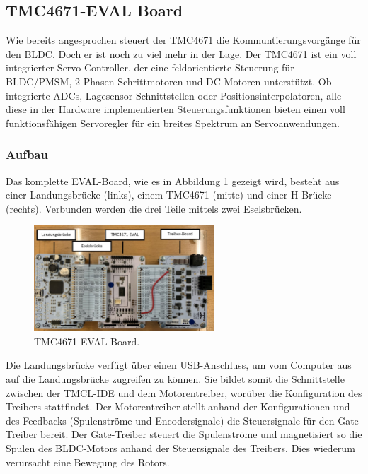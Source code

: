 \subsection{TMC4671-EVAL Board}\label{subsec:TMC4671_EVAL_Boad}

Wie bereits angesprochen steuert der TMC4671 die Kommuntierungsvorgänge für den BLDC. Doch er ist noch zu viel mehr in der Lage. Der TMC4671 ist ein voll integrierter Servo-Controller, der eine feldorientierte Steuerung für BLDC/PMSM, 2-Phasen-Schrittmotoren und DC-Motoren unterstützt. Ob integrierte ADCs, Lagesensor-Schnittstellen oder Positionsinterpolatoren, alle diese in der Hardware implementierten Steuerungsfunktionen bieten einen voll funktionsfähigen Servoregler für ein breites Spektrum an Servoanwendungen. \cite{trinamic_datasheet_2018}

\subsubsection{Aufbau}\label{subsubsec:TMC4671_Aufbau}

Das komplette EVAL-Board, wie es in Abbildung \ref{fig:TMC4671_EVAL_Board} gezeigt wird, besteht aus einer Landungsbrücke (links), einem TMC4671 (mitte) und einer H-Brücke (rechts). Verbunden werden die drei Teile mittels zwei Eselsbrücken.

\begin{figure}[h!]
	\centering
	\includegraphics[width=0.6\textwidth]{graphics/TMC4671_EVAL.jpg}
	\caption{TMC4671-EVAL Board. 
	\cite{unbekannt_foc-motorenansteuerung_2019}
	}
	\label{fig:TMC4671_EVAL_Board}
\end{figure}

Die Landungsbrücke verfügt über einen USB-Anschluss, um vom Computer aus auf die Landungsbrücke zugreifen zu können. Sie bildet somit die Schnittstelle zwischen der TMCL-IDE und dem Motorentreiber, worüber die Konfiguration des Treibers stattfindet.
Der Motorentreiber stellt anhand der Konfigurationen und des Feedbacks (Spulenströme und Encodersignale) die Steuersignale für den Gate-Treiber bereit.
Der Gate-Treiber steuert die Spulenströme und magnetisiert so die Spulen des BLDC-Motors anhand der Steuersignale des Treibers. Dies wiederum verursacht eine Bewegung des Rotors.

